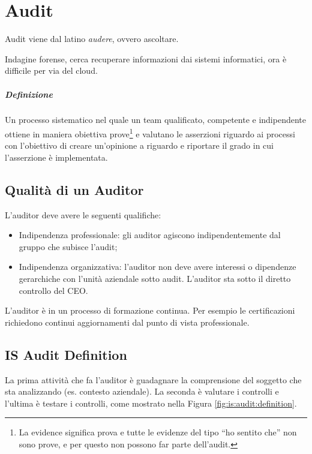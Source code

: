 \chapter{Audit}
\label{audit}

Audit viene dal latino \textit{audere}, ovvero ascoltare.

Indagine forense, cerca recuperare informazioni dai sistemi informatici, ora è
difficile per via del cloud.

\paragraph*{Definizione}

Un processo sistematico nel quale un team qualificato, competente e
indipendente ottiene in maniera obiettiva prove\footnote{La evidence significa
prova e tutte le evidenze del tipo ``ho sentito che'' non sono prove, e per
questo non possono far parte dell'audit.} e valutano le asserzioni riguardo ai
processi con l'obiettivo di creare un'opinione a riguardo e riportare il grado
in cui l'asserzione è implementata.


\section{Qualità di un Auditor}

L'auditor deve avere le seguenti qualifiche:
\begin{itemize}
\item Indipendenza professionale: gli auditor agiscono indipendentemente dal
gruppo che subisce l'audit;
\item Indipendenza organizzativa: l'auditor non deve avere interessi o
dipendenze gerarchiche con l'unità aziendale sotto audit. L'auditor sta sotto
il diretto controllo del CEO.
\end{itemize}

L'auditor è in un processo di formazione continua. Per esempio le
certificazioni richiedono continui aggiornamenti dal punto di vista
professionale.

\section{IS Audit Definition}

La prima attività che fa l'auditor è guadagnare la comprensione del soggetto
che sta analizzando (es. contesto aziendale).
La seconda è valutare i controlli e l'ultima è testare i controlli, come
mostrato nella Figura \ref{fig:is:audit:definition}.

